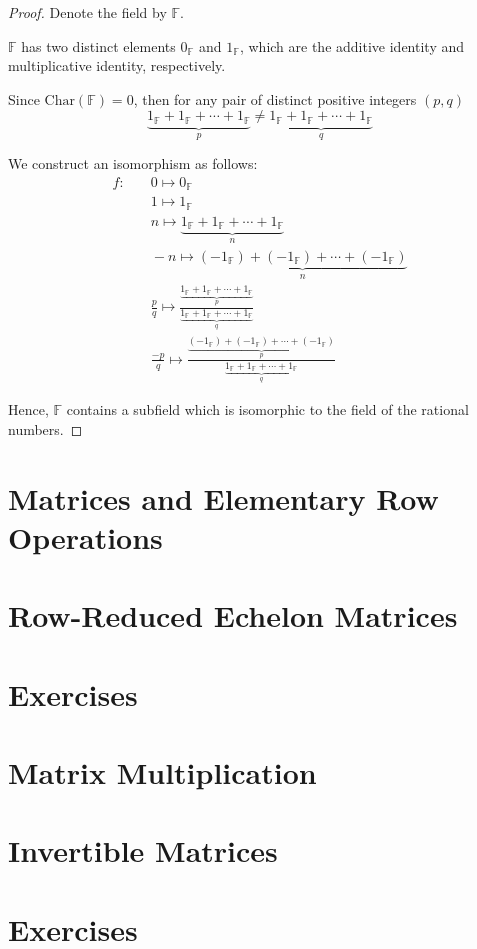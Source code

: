 \begin{proof}
    Denote the field by $\mathbb{F}$.

    $\mathbb{F}$ has two distinct elements $0_{\mathbb{F}}$ and $1_{\mathbb{F}}$, which are the additive identity and multiplicative identity, respectively.

    Since $\text{Char}(\mathbb{F}) = 0$, then for any pair of distinct positive integers $(p, q)$
    \[
        \underbrace{1_{\mathbb{F}} + 1_{\mathbb{F}} + \cdots + 1_{\mathbb{F}}}_{p} \ne \underbrace{1_{\mathbb{F}} + 1_{\mathbb{F}} + \cdots + 1_{\mathbb{F}}}_{q}
    \]

    We construct an isomorphism as follows:
    \[
        \begin{split}
            f:&\quad 0 \mapsto 0_{\mathbb{F}} \\
            &\quad 1 \mapsto 1_{\mathbb{F}} \\
            &\quad n \mapsto \underbrace{1_{\mathbb{F}} + 1_{\mathbb{F}} + \cdots + 1_{\mathbb{F}}}_{n} \\
            &\quad -n \mapsto \underbrace{(-1_{\mathbb{F}}) + (-1_{\mathbb{F}}) + \cdots + (-1_{\mathbb{F}})}_{n} \\
            &\quad \frac{p}{q} \mapsto \frac{\underbrace{1_{\mathbb{F}} + 1_{\mathbb{F}} + \cdots + 1_{\mathbb{F}}}_{p}}{\underbrace{1_{\mathbb{F}} + 1_{\mathbb{F}} + \cdots + 1_{\mathbb{F}}}_{q}} \\
            &\quad \frac{-p}{q} \mapsto \frac{\underbrace{(-1_{\mathbb{F}}) + (-1_{\mathbb{F}}) + \cdots + (-1_{\mathbb{F}})}_{p}}{\underbrace{1_{\mathbb{F}} + 1_{\mathbb{F}} + \cdots + 1_{\mathbb{F}}}_{q}}
        \end{split}
    \]

    Hence, $\mathbb{F}$ contains a subfield which is isomorphic to the field of the rational numbers.
\end{proof}

\section{Matrices and Elementary Row Operations}

\section{Row-Reduced Echelon Matrices}

\section*{Exercises}

\section{Matrix Multiplication}

\section{Invertible Matrices}

\section*{Exercises}
